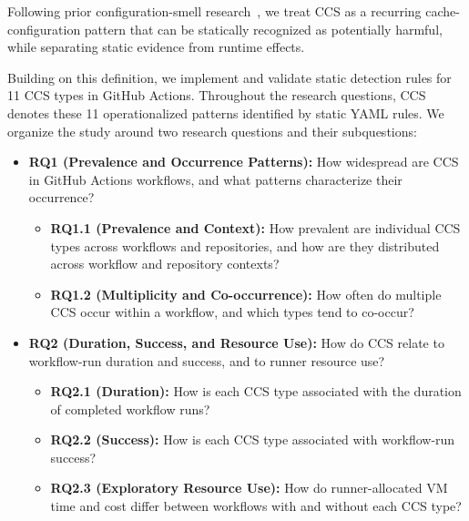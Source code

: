 \documentclass[smallextended]{svjour3}
\begin{document}
Following prior configuration-smell research~\citep{sharma2016configuration,vassallo2020cd,gallaba2020travis,zhang2022buildsonic,khatami2024gha}, we treat CCS as a recurring cache-configuration pattern that can be statically recognized as potentially harmful, while separating static evidence from runtime effects.

Building on this definition, we implement and validate static detection rules for 11 CCS types in GitHub Actions. Throughout the research questions, CCS denotes these 11 operationalized patterns identified by static YAML rules. We organize the study around two research questions and their subquestions:

\begin{itemize}
  \item \textbf{RQ1 (Prevalence and Occurrence Patterns):} How widespread are CCS in GitHub Actions workflows, and what patterns characterize their occurrence?
  \begin{itemize}
    \item \textbf{RQ1.1 (Prevalence and Context):} How prevalent are individual CCS types across workflows and repositories, and how are they distributed across workflow and repository contexts?
    \item \textbf{RQ1.2 (Multiplicity and Co-occurrence):} How often do multiple CCS occur within a workflow, and which types tend to co-occur?
  \end{itemize}

  \item \textbf{RQ2 (Duration, Success, and Resource Use):} How do CCS relate to workflow-run duration and success, and to runner resource use?
  \begin{itemize}
    \item \textbf{RQ2.1 (Duration):} How is each CCS type associated with the duration of completed workflow runs?
    \item \textbf{RQ2.2 (Success):} How is each CCS type associated with workflow-run success?
    \item \textbf{RQ2.3 (Exploratory Resource Use):} How do runner-allocated VM time and cost differ between workflows with and without each CCS type?
  \end{itemize}

\end{itemize}
\end{document}
